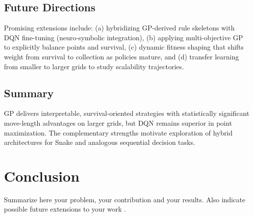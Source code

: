 \documentclass[a4paper,12pt]{article}
\begin{document}
\subsection{Future Directions}
Promising extensions include: (a) hybridizing GP-derived rule skeletons with DQN fine-tuning (neuro-symbolic integration), (b) applying multi-objective GP to explicitly balance points and survival, (c) dynamic fitness shaping that shifts weight from survival to collection as policies mature, and (d) transfer learning from smaller to larger grids to study scalability trajectories.

\subsection{Summary}
GP delivers interpretable, survival-oriented strategies with statistically significant move-length advantages on larger grids, but DQN remains superior in point maximization. The complementary strengths motivate exploration of hybrid architectures for Snake and analogous sequential decision tasks.


\section{Conclusion}
Summarize here your problem, your contribution and your results. Also indicate possible future extensions to your work \cite{09OLI00}.



\end{document}
